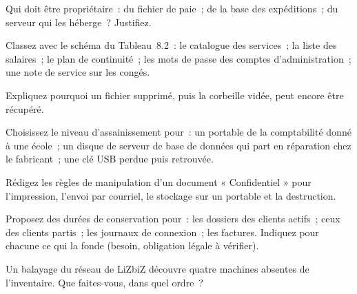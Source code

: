 \bigskip

\begin{boxexo}[title={\ding{45}\quad Exercice~8.1. Le propriétaire \niveaubase}]
Qui doit être propriétaire~: du fichier de paie~; de la base des
expéditions~; du serveur qui les héberge~? Justifiez.
\end{boxexo}

\begin{boxexo}[title={\ding{45}\quad Exercice~8.2. Classer \niveaubase}]
Classez avec le schéma du Tableau~8.2~: le catalogue des services~; la
liste des salaires~; le plan de continuité~; les mots de passe des
comptes d'administration~; une note de service sur les congés.
\end{boxexo}

\begin{boxexo}[title={\ding{45}\quad Exercice~8.3. Supprimer \niveaubase}]
Expliquez pourquoi un fichier supprimé, puis la corbeille vidée, peut
encore être récupéré.
\end{boxexo}

\begin{boxexo}[title={\ding{45}\quad Exercice~8.4. Assainir \niveaumoyen}]
Choisissez le niveau d'assainissement pour~: un portable de la
comptabilité donné à une école~; un disque de serveur de base de
données qui part en réparation chez le fabricant~; une clé USB perdue
puis retrouvée.
\end{boxexo}

\begin{boxexo}[title={\ding{45}\quad Exercice~8.5. Règles de manipulation \niveaumoyen}]
Rédigez les règles de manipulation d'un document « Confidentiel » pour
l'impression, l'envoi par courriel, le stockage sur un portable et la
destruction.
\end{boxexo}

\begin{boxexo}[title={\ding{45}\quad Exercice~8.6. Conservation \niveaumoyen}]
Proposez des durées de conservation pour~: les dossiers des clients
actifs~; ceux des clients partis~; les journaux de connexion~; les
factures. Indiquez pour chacune ce qui la fonde (besoin, obligation
légale à vérifier).
\end{boxexo}

\begin{boxexo}[title={\ding{45}\quad Exercice~8.7. Inventaire et détection \niveaumoyen}]
Un balayage du réseau de LiZbiZ découvre quatre machines absentes de
l'inventaire. Que faites-vous, dans quel ordre~?
\end{boxexo}

